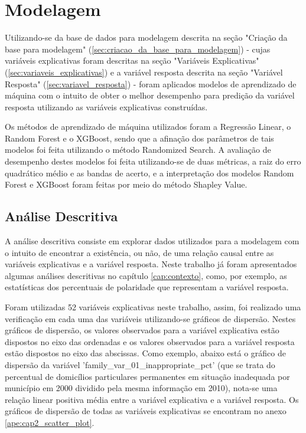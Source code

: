 \chapter{Modelagem}
\label{cap:modelagem}

Utilizando-se da base de dados para modelagem descrita na seção "Criação da base para modelagem" (\ref{sec:criacao_da_base_para_modelagem}) - cujas variáveis explicativas foram descritas na seção "Variáveis Explicativas" (\ref{sec:variaveis_explicativas}) e a variável resposta descrita na seção "Variável Resposta" (\ref{sec:variavel_resposta}) - foram aplicados modelos de aprendizado de máquina com o intuito de obter o melhor desempenho para predição da variável resposta utilizando as variáveis explicativas construídas.

Os métodos de aprendizado de máquina utilizados foram a Regressão Linear, o Random Forest e o XGBoost, sendo que a afinação dos parâmetros de tais modelos foi feita utilizando o método Randomized Search. A avaliação de desempenho destes modelos foi feita utilizando-se de duas métricas, a raiz do erro quadrático médio e as bandas de acerto, e a interpretação dos modelos Random Forest e XGBoost foram feitas por meio do método Shapley Value.

\section{Análise Descritiva}
\label{sec:analise_descritiva}

A análise descritiva consiste em explorar dados utilizados para a modelagem com o intuito de encontrar a existência, ou não, de uma relação causal entre as variáveis explicativas e a variável resposta. Neste trabalho já foram apresentados algumas análises descritivas no capítulo \ref{cap:contexto}, como, por exemplo, as estatísticas dos percentuais de polaridade que representam a variável resposta.

Foram utilizadas 52 variáveis explicativas neste trabalho, assim, foi realizado uma verificação em cada uma das variáveis utilizando-se gráficos de dispersão. Nestes gráficos de dispersão, os valores observados para a variável explicativa estão dispostos no eixo das ordenadas e os valores observados para a variável resposta estão dispostos no eixo das abscissas. Como exemplo, abaixo está o gráfico de dispersão da variável 'family_var_01_inappropriate_pct' (que se trata do percentual de domicílios particulares permanentes em situação inadequada por município em 2000 dividido pela mesma informação em 2010), nota-se uma relação linear positiva média entre a variável explicativa e a variável resposta. Os gráficos de dispersão de todas as variáveis explicativas se encontram no anexo \ref{ape:cap2_scatter_plot}.

